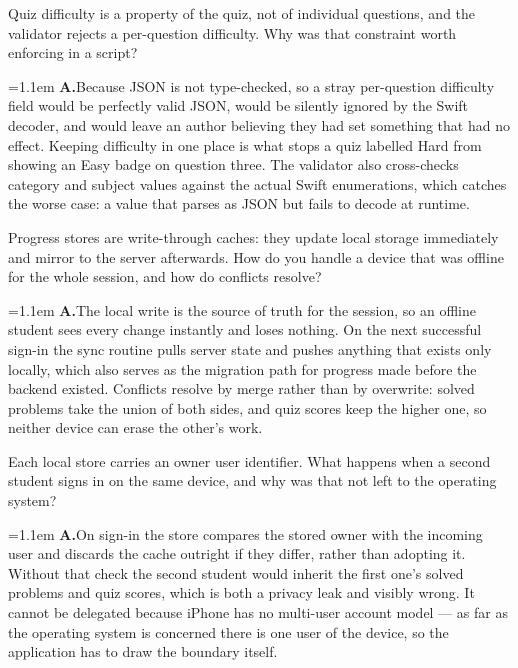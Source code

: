 \documentclass[11pt,a4paper]{article}
\newcommand{\ans}[1]{%
  \par\vspace{0.32em}%
  \begingroup
  \small\color{answerink}%
  \leftskip=1.1em
  \noindent\textbf{\color{accent}A.}\hspace{0.45em}#1\par
  \endgroup
  \vspace{0.1em}%
}
\begin{document}
\begin{questions}[resume]
\item Quiz difficulty is a property of the quiz, not of individual questions, and
the validator rejects a per-question difficulty. Why was that constraint worth
enforcing in a script?
\ans{Because JSON is not type-checked, so a stray per-question difficulty field
would be perfectly valid JSON, would be silently ignored by the Swift decoder,
and would leave an author believing they had set something that had no effect.
Keeping difficulty in one place is what stops a quiz labelled Hard from showing an
Easy badge on question three. The validator also cross-checks category and subject
values against the actual Swift enumerations, which catches the worse case: a
value that parses as JSON but fails to decode at runtime.}

\item Progress stores are write-through caches: they update local storage
immediately and mirror to the server afterwards. How do you handle a device that
was offline for the whole session, and how do conflicts resolve?
\ans{The local write is the source of truth for the session, so an offline
student sees every change instantly and loses nothing. On the next successful
sign-in the sync routine pulls server state and pushes anything that exists only
locally, which also serves as the migration path for progress made before the
backend existed. Conflicts resolve by merge rather than by overwrite: solved
problems take the union of both sides, and quiz scores keep the higher one, so
neither device can erase the other's work.}

\item Each local store carries an owner user identifier. What happens when a
second student signs in on the same device, and why was that not left to the
operating system?
\ans{On sign-in the store compares the stored owner with the incoming user and
discards the cache outright if they differ, rather than adopting it. Without that
check the second student would inherit the first one's solved problems and quiz
scores, which is both a privacy leak and visibly wrong. It cannot be delegated
because iPhone has no multi-user account model --- as far as the operating system
is concerned there is one user of the device, so the application has to draw the
boundary itself.}

\end{questions}
\end{document}
